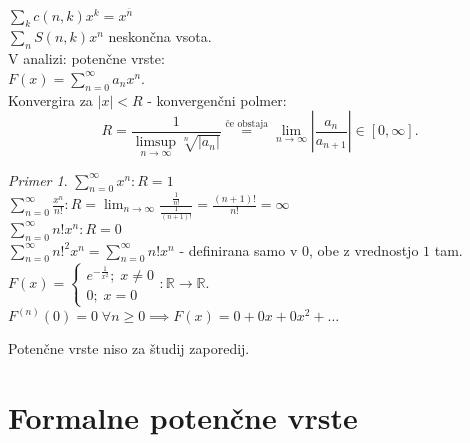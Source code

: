 \documentclass[a4paper, 12pt]{book}
\theoremstyle{definition}
\theoremstyle{remark}
\newtheorem*{ex}{Primer}
\newcommand{\R}{\mathbb{R}}
\begin{document}
$\sum_k c(n,k) x^k = x^{\overline{n}}$ \\
$\sum_n S(n,k) x^n$ neskončna vsota. \\
V analizi: potenčne vrste: \\
$F(x) = \sum_{n=0}^{\infty} a_n x^n$. \\
Konvergira za $|x| < R$ - konvergenčni polmer:
\begin{equation*}
  R = \frac{1}{\limsup_{n \to \infty} \sqrt[n]{|a_n|}} \stackrel{\text{če obstaja}}{=}
  \lim_{n \to \infty} \left|\frac{a_n}{a_{n+1}}\right| \in [0, \infty].
\end{equation*}
\begin{ex}
  $\sum_{n=0}^{\infty} x^n: R = 1$ \\
  $\sum_{n=0}^{\infty} \frac{x^n}{n!}: R = \lim_{n \to \infty} \frac{\frac{1}{n!}}{\frac{1}{(n+1)!}}
    = \frac{(n+1)!}{n!} = \infty$ \\
  $\sum_{n=0}^{\infty} n! x^n: R = 0$ \\
  $\sum_{n=0}^{\infty} n!^2 x^n = \sum_{n=0}^{\infty} n! x^n$ - definirana samo v $0$, obe z vrednostjo $1$ tam. \\
  $F(x) = \begin{cases}
    e^{-\frac{1}{x^2}}; \; x \neq 0 \\
    0; \; x = 0
  \end{cases}: \R \to \R$. \\
  $F^{(n)}(0) = 0 \; \forall n \geq 0 \implies F(x) = 0 + 0x + 0x^2 + \dots$
\end{ex}
Potenčne vrste niso  za študij zaporedij.


\section{Formalne potenčne vrste}
\end{document}
